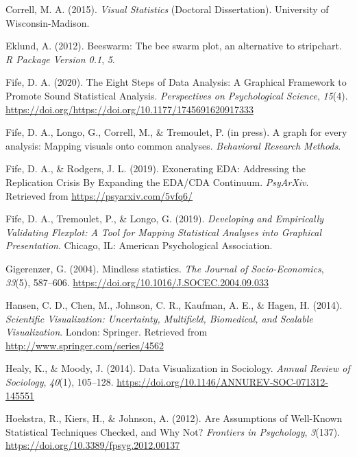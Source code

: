 \documentclass[
  english,
  man]{apa6}
\newlength{\cslhangindent}
\newenvironment{cslreferences}%
  {\setlength{\parindent}{0pt}%
  \everypar{\setlength{\hangindent}{\cslhangindent}}\ignorespaces}%
  {\par}
\begin{document}
\begin{cslreferences}
\leavevmode\hypertarget{ref-Correll2015}{}%
Correll, M. A. (2015). \emph{Visual Statistics} (Doctoral Dissertation). University of Wisconsin-Madison.

\leavevmode\hypertarget{ref-eklund2012beeswarm}{}%
Eklund, A. (2012). Beeswarm: The bee swarm plot, an alternative to stripchart. \emph{R Package Version 0.1}, \emph{5}.

\leavevmode\hypertarget{ref-Fife2019e}{}%
Fife, D. A. (2020). The Eight Steps of Data Analysis: A Graphical Framework to Promote Sound Statistical Analysis. \emph{Perspectives on Psychological Science}, \emph{15}(4). \url{https://doi.org/https://doi.org/10.1177/1745691620917333}

\leavevmode\hypertarget{ref-fife2020bb}{}%
Fife, D. A., Longo, G., Correll, M., \& Tremoulet, P. (in press). A graph for every analysis: Mapping visuals onto common analyses. \emph{Behavioral Research Methods}.

\leavevmode\hypertarget{ref-Fife2019a}{}%
Fife, D. A., \& Rodgers, J. L. (2019). Exonerating EDA: Addressing the Replication Crisis By Expanding the EDA/CDA Continuum. \emph{PsyArXiv}. Retrieved from \url{https://psyarxiv.com/5vfq6/}

\leavevmode\hypertarget{ref-Fife2019d}{}%
Fife, D. A., Tremoulet, P., \& Longo, G. (2019). \emph{Developing and Empirically Validating Flexplot: A Tool for Mapping Statistical Analyses into Graphical Presentation}. Chicago, IL: American Psychological Association.

\leavevmode\hypertarget{ref-Gigerenzer2004}{}%
Gigerenzer, G. (2004). Mindless statistics. \emph{The Journal of Socio-Economics}, \emph{33}(5), 587--606. \url{https://doi.org/10.1016/J.SOCEC.2004.09.033}

\leavevmode\hypertarget{ref-Hansen}{}%
Hansen, C. D., Chen, M., Johnson, C. R., Kaufman, A. E., \& Hagen, H. (2014). \emph{Scientific Visualization: Uncertainty, Multifield, Biomedical, and Scalable Visualization}. London: Springer. Retrieved from \url{http://www.springer.com/series/4562}

\leavevmode\hypertarget{ref-Healy2014a}{}%
Healy, K., \& Moody, J. (2014). Data Visualization in Sociology. \emph{Annual Review of Sociology}, \emph{40}(1), 105--128. \url{https://doi.org/10.1146/ANNUREV-SOC-071312-145551}

\leavevmode\hypertarget{ref-hoekstra_are_2012}{}%
Hoekstra, R., Kiers, H., \& Johnson, A. (2012). Are Assumptions of Well-Known Statistical Techniques Checked, and Why Not? \emph{Frontiers in Psychology}, \emph{3}(137). \url{https://doi.org/10.3389/fpsyg.2012.00137}


\end{cslreferences}
\end{document}
